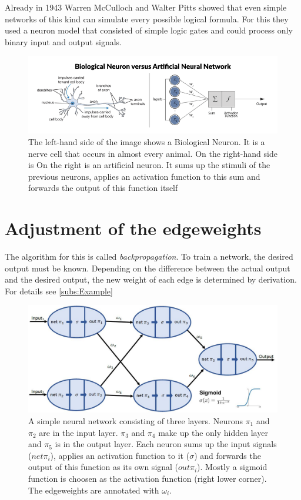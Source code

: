 Already in 1943 Warren McCulloch and Walter Pitts \cite{mcculloch} showed that even simple networks of this kind can simulate every possible logical formula. For this they used a neuron model that consisted of simple logic gates and could process only binary input and output signals.

\begin{figure}[h]
	\centering
	\includegraphics[width=1\linewidth]{Figures/chap1/bio_vs_arti_neuron.png}
	\caption[Caption for LOF]{The left-hand side of the image \footnotemark shows a Biological Neuron. It is a nerve cell that occurs in almost every animal. On the right-hand side is On the right is an artificial neuron. It sums up the stimuli of the previous neurons, applies an activation function to this sum and forwards the output of this function itself}
	\label{fig:test1}
\end{figure}


\section{Adjustment of the edgeweights}
The algorithm for this is called \textit{backpropagation}. To train a network, the desired output must be known. Depending on the difference between the actual output and the desired output, the new weight of each edge is determined by derivation. For details see \ref{subs:Example}

\lipsum[1]


\begin{figure}[h]
	\centering
	\includegraphics[width=1\linewidth]{Figures/chap1/backpropagation_example.JPG}
	\caption{A simple neural network consisting of three layers. Neurons $\pi_1$ and $\pi_2$ are in the input layer. $\pi_3$ and $\pi_4$ make up the only hidden layer and $\pi_5$ is in the output layer. Each neuron sums up the input signals ($net\pi_i$), applies an activation function to it ($\sigma$) and forwards the output of this function as its own signal ($out\pi_i$). Mostly a sigmoid function is choosen as the activation function (right lower corner). The edgeweights are annotated with $\omega_i$.}
	\label{fig:backpropagation}
\end{figure}

